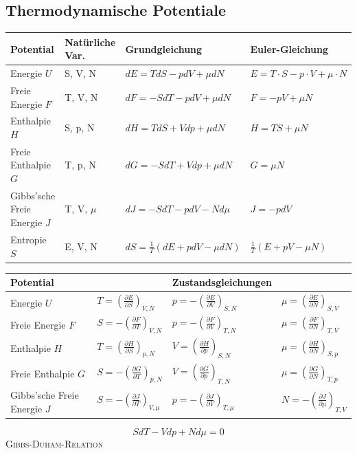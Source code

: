 \documentclass[12pt,a4paper]{article}
\newcommand{\pd}[2]{\frac{\partial #1}{\partial #2}}
\renewcommand{\=}[1]{\stackrel{#1}{=}}
\theoremstyle{definition}
\theoremstyle{remark}
\begin{document}
\subsection{Thermodynamische Potentiale}

\begin{tabular}{llll}
\toprule
Potential & Natürliche Var. & Grundgleichung & Euler-Gleichung\\
\midrule
Energie $U$ & S, V, N & $dE = T dS - p dV + \mu dN$ & $E = T \cdot S - p \cdot V + \mu \cdot N$\\
Freie Energie $F$ & T, V, N & $dF = -S dT - p dV + \mu dN$ & $F = -pV + \mu N$\\
Enthalpie $H$ & S, p, N & $dH = T dS + V dp + \mu dN$ & $H = TS + \mu N$\\
Freie Enthalpie $G$ & T, p, N & $dG = -S dT + V dp + \mu dN$ & $G = \mu N$\\
\makecell[l]{Gibbs'sche\\ Freie Energie $J$} & T, V, $\mu$ & $dJ = -S dT - p dV - N d\mu$ & $J = -pdV$\\
Entropie $S$ & E, V, N & $dS = \frac{1}{T} (dE + p dV - \mu dN)$ & $\frac{1}{T}(E + pV - \mu N)$\\
\bottomrule
\end{tabular}

\noindent \begin{tabular}{llll}
\toprule
Potential & & Zustandsgleichungen & \\
\midrule
Energie $U$ & $T = (\pd{E}{S})_{V, N}$ & $p = - (\pd{E}{V})_{S, N}$ & $\mu = (\pd{E}{N})_{S, V}$\\
Freie Energie $F$ & $S = -(\pd{F}{T})_{V, N}$ & $p = - (\pd{F}{V})_{T, N}$ & $\mu = (\pd{F}{N})_{T, V}$\\
Enthalpie $H$ & $T = (\pd{H}{S})_{p,N}$ & $V = (\pd{H}{p})_{S,N}$ & $\mu = (\pd{H}{N})_{S,p}$\\
Freie Enthalpie $G$ & $S = -(\pd{G}{T})_{p,N}$ & $V = (\pd{G}{p})_{T,N}$ & $\mu = (\pd{G}{N})_{T,p}$\\
Gibbs'sche Freie Energie $J$ & $S = -(\pd{J}{T})_{V, \mu}$ & $p = -(\pd{J}{V})_{T,\mu}$ & $N = -(\pd{J}{\mu})_{T,V}$\\
\bottomrule
\end{tabular}

\begin{framed}
$$S dT - V dp + N d\mu = 0$$
\centering\textsc{Gibbs-Duham-Relation}
\end{framed}

\end{document}
